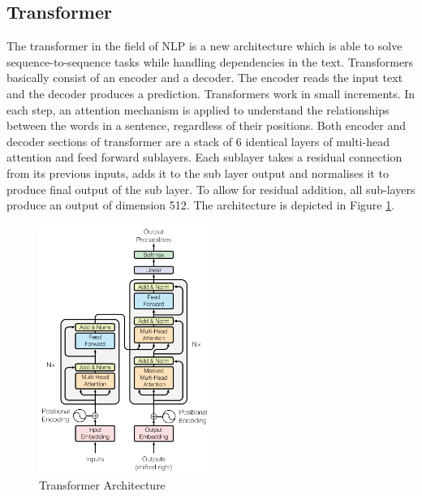 \subsection{Transformer}
The transformer in the field of NLP is a new architecture which is able to solve sequence-to-sequence tasks while handling dependencies in the text. Transformers basically consist of an encoder and a decoder. The encoder reads the input text and the decoder produces a prediction. Transformers work in small increments. In each step, an attention mechanism is applied to understand the relationships between the words in a sentence, regardless of their positions. Both encoder and decoder sections of transformer are a stack of 6 identical layers of multi-head attention and feed forward sublayers. \alert{Each sublayer takes a residual connection from its previous inputs, adds it to the sub layer output and normalises it to produce final output of the sub layer. To allow for residual addition, all sub-layers produce an output of dimension 512.} The architecture is depicted in Figure \ref{fig:transformer}.


\begin{figure}[H]
	\centering
	\includegraphics[width=0.5\textwidth]{figures/transformer_architecture.png}
	\caption{Transformer Architecture}
	\label{fig:transformer}
\end{figure}

